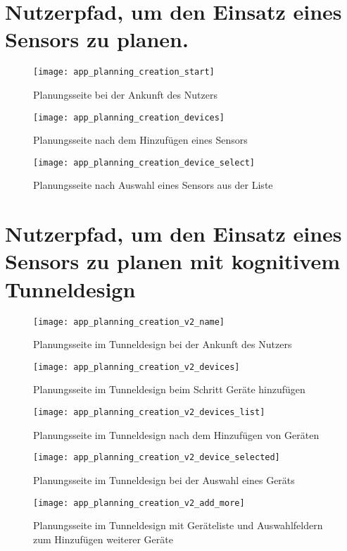 \section{Nutzerpfad, um den Einsatz eines Sensors zu planen.} \label{appendix:planing_devices_flow}

\begin{figure}[H]
  \centering
  \texttt{[image: app\_planning\_creation\_start]}
  \caption{Planungsseite bei der Ankunft des Nutzers}
  \label{fig:app_planning_creation_start}
\end{figure}
\begin{figure}[H]
  \centering
  \texttt{[image: app\_planning\_creation\_devices]}
  \caption{Planungsseite nach dem Hinzufügen eines Sensors}
  \label{fig:app_planning_creation_devices}
\end{figure}
\begin{figure}[H]
  \centering
  \texttt{[image: app\_planning\_creation\_device\_select]}
  \caption{Planungsseite nach Auswahl eines Sensors aus der Liste}
  \label{fig:app_planning_creation_device_select}
\end{figure}

\section{Nutzerpfad, um den Einsatz eines Sensors zu planen mit kognitivem Tunneldesign} \label{appendix:planing_devices_flow_tunneling}

\begin{figure}[H]
  \centering
  \texttt{[image: app\_planning\_creation\_v2\_name]}
  \caption{Planungsseite im Tunneldesign bei der Ankunft des Nutzers}
  \label{fig:app_planning_creation_v2_name}
\end{figure}
\begin{figure}[H]
  \centering
  \texttt{[image: app\_planning\_creation\_v2\_devices]}
  \caption{Planungsseite im Tunneldesign beim Schritt Geräte hinzufügen}
  \label{fig:app_planning_creation_v2_devices}
\end{figure}
\begin{figure}[H]
  \centering
  \texttt{[image: app\_planning\_creation\_v2\_devices\_list]}
  \caption{Planungsseite im Tunneldesign nach dem Hinzufügen von Geräten }
  \label{fig:app_planning_creation_v2_devices_list}
\end{figure}
\begin{figure}[H]
  \centering
  \texttt{[image: app\_planning\_creation\_v2\_device\_selected]}
  \caption{Planungsseite im Tunneldesign bei der Auswahl eines Geräts}
  \label{fig:app_planning_creation_v2_device_selected}
\end{figure}
\begin{figure}[H]
  \centering
  \texttt{[image: app\_planning\_creation\_v2\_add\_more]}
  \caption{Planungsseite im Tunneldesign mit Geräteliste und Auswahlfeldern zum Hinzufügen weiterer Geräte}
  \label{fig:app_planning_creation_v2_add_more}
\end{figure}